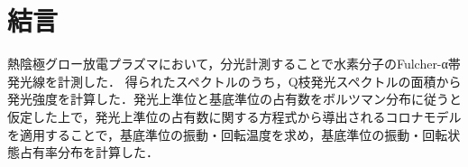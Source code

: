 \chapter{結言}

熱陰極グロー放電プラズマにおいて，分光計測することで水素分子のFulcher-α帯発光線を計測した．
得られたスペクトルのうち，Q枝発光スペクトルの面積から発光強度を計算した．発光上準位と基底準位の占有数をボルツマン分布に従うと仮定した上で，発光上準位の占有数に関する方程式から導出されるコロナモデルを適用することで，基底準位の振動・回転温度を求め，基底準位の振動・回転状態占有率分布を計算した．